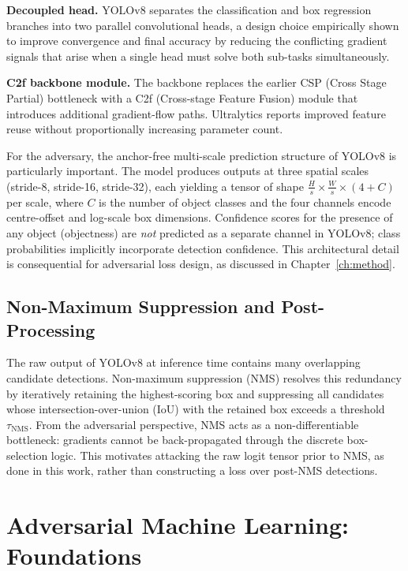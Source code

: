 \documentclass[12pt,a4paper]{report}
\begin{document}
\textbf{Decoupled head.} YOLOv8 separates the classification and box
regression branches into two parallel convolutional heads, a design choice
empirically shown to improve convergence and final accuracy by reducing the
conflicting gradient signals that arise when a single head must solve both
sub-tasks simultaneously.

\textbf{C2f backbone module.} The backbone replaces the earlier CSP (Cross
Stage Partial) bottleneck with a C2f (Cross-stage Feature Fusion) module \cite{jocher2023ultralytics} that
introduces additional gradient-flow paths. Ultralytics reports improved feature
reuse without proportionally increasing parameter count.

For the adversary, the anchor-free multi-scale prediction structure of YOLOv8
is particularly important. The model produces outputs at three spatial scales
(stride-8, stride-16, stride-32), each yielding a tensor of shape
$\tfrac{H}{s} \times \tfrac{W}{s} \times (4 + C)$ per scale, where $C$ is
the number of object classes and the four channels encode centre-offset and
log-scale box dimensions. Confidence scores for the presence of any object
(objectness) are \emph{not} predicted as a separate channel in YOLOv8; class
probabilities implicitly incorporate detection confidence. This architectural
detail is consequential for adversarial loss design, as discussed in
Chapter~\ref{ch:method}.

\subsection{Non-Maximum Suppression and Post-Processing}

The raw output of YOLOv8 at inference time contains many overlapping
candidate detections. Non-maximum suppression (NMS) resolves this redundancy
by iteratively retaining the highest-scoring box and suppressing all
candidates whose intersection-over-union (IoU) with the retained box exceeds a
threshold $\tau_{\text{NMS}}$. From the adversarial perspective, NMS acts as
a non-differentiable bottleneck: gradients cannot be back-propagated through
the discrete box-selection logic. This motivates attacking the raw logit
tensor prior to NMS, as done in this work, rather than constructing a loss
over post-NMS detections.

\section{Adversarial Machine Learning: Foundations}
\label{sec:adv_foundations}
\end{document}
